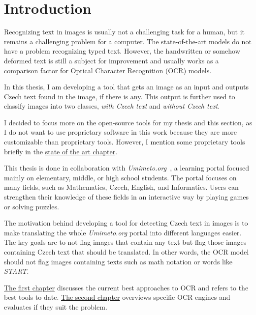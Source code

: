 \documentclass[
  digital,     %
  oneside,     %
  nosansbold,  %
  nocolorbold, %
  nolof,         %
  nolot,         %
]{fithesis4}
\begin{document}

\chapter*{Introduction}

Recognizing text in images is usually not a challenging task for a human, but it remains a challenging problem for a computer. The state-of-the-art models do not have a problem recognizing typed text. However, the handwritten or somehow deformed text is still a subject for improvement and usually works as a comparison factor for Optical Character Recognition (OCR) models.

In this thesis, I am developing a tool that gets an image as an input and outputs Czech text found in the image, if there is any. This output is further used to classify images into two classes, \emph{with Czech text} and \emph{without Czech text}.

I decided to focus more on the open-source tools for my thesis and this section, as I do not want to use proprietary software in this work because they are more customizable than proprietary tools. However, I mention some proprietary tools briefly in the \hyperref[chap:sota]{state of the art chapter}.

This thesis is done in collaboration with \emph{Umimeto.org}~\cite{umimeto}, a learning portal focused mainly on elementary, middle, or high school students. The portal focuses on many fields, such as Mathematics, Czech, English, and Informatics. Users can strengthen their knowledge of these fields in an interactive way by playing games or solving puzzles.

The motivation behind developing a tool for detecting Czech text in images is to make translating the whole \emph{Umimeto.org} portal into different languages easier. The key goals are to not flag images that contain any text but flag those images containing Czech text that should be translated. In other words, the OCR model should not flag images containing texts such as math notation or words like \emph{START}.

\hyperref[chap:sota]{The first chapter} discusses the current best approaches to OCR and refers to the best tools to date. \hyperref[chap:ocr-engines]{The second chapter} overviews specific OCR engines and evaluates if they suit the problem.
\end{document}
